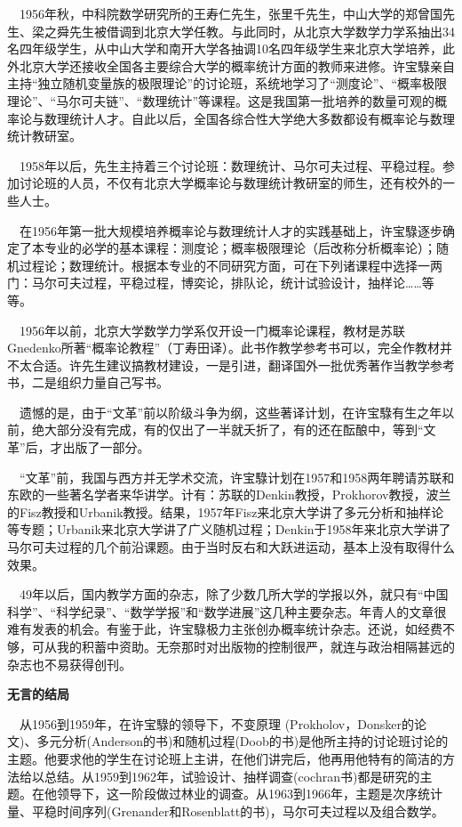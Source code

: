 \documentclass[a4paper,AutoFakeBold,oneside,12pt]{article}
\begin{document}
	$\quad$1956年秋，中科院数学研究所的王寿仁先生，张里千先生，中山大学的郑曾国先生、梁之舜先生被借调到北京大学任教。与此同时，从北京大学数学力学系抽出34名四年级学生，从中山大学和南开大学各抽调10名四年级学生来北京大学培养，此外北京大学还接收全国各主要综合大学的概率统计方面的教师来进修。许宝騄亲自主持“独立随机变量族的极限理论”的讨论班，系统地学习了“测度论”、“概率极限理论”、“马尔可夫链”、“数理统计”等课程。这是我国第一批培养的数量可观的概率论与数理统计人才。自此以后，全国各综合性大学绝大多数都设有概率论与数理统计教研室。

$\quad$1958年以后，先生主持着三个讨论班：数理统计、马尔可夫过程、平稳过程。参加讨论班的人员，不仅有北京大学概率论与数理统计教研室的师生，还有校外的一些人士。

	$\quad$在1956年第一批大规模培养概率论与数理统计人才的实践基础上，许宝騄逐步确定了本专业的必学的基本课程：测度论；概率极限理论（后改称分析概率论）；随机过程论；数理统计。根据本专业的不同研究方面，可在下列诸课程中选择一两门：马尔可夫过程，平稳过程，博奕论，排队论，统计试验设计，抽样论……等等。

$\quad$1956年以前，北京大学数学力学系仅开设一门概率论课程，教材是苏联Gnedenko所著“概率论教程”（丁寿田译）。此书作教学参考书可以，完全作教材并不太合适。许先生建议搞教材建设，一是引进，翻译国外一批优秀著作当教学参考书，二是组织力量自己写书。

$\quad$遗憾的是，由于“文革”前以阶级斗争为纲，这些著译计划，在许宝騄有生之年以前，绝大部分没有完成，有的仅出了一半就夭折了，有的还在酝酿中，等到“文革”后，才出版了一部分。

	$\quad$“文革”前，我国与西方并无学术交流，许宝騄计划在1957和1958两年聘请苏联和东欧的一些著名学者来华讲学。计有：苏联的Denkin教授，Prokhorov教授，波兰的Fisz教授和Urbanik教授。结果，1957年Fisz来北京大学讲了多元分析和抽样论等专题；Urbanik来北京大学讲了广义随机过程；Denkin于1958年来北京大学讲了马尔可夫过程的几个前沿课题。由于当时反右和大跃进运动，基本上没有取得什么效果。

$\quad$49年以后，国内教学方面的杂志，除了少数几所大学的学报以外，就只有“中国科学”、“科学纪录”、“数学学报”和“数学进展”这几种主要杂志。年青人的文章很难有发表的机会。有鉴于此，许宝騄极力主张创办概率统计杂志。还说，如经费不够，可从我的积蓄中资助。无奈那时对出版物的控制很严，就连与政治相隔甚远的杂志也不易获得创刊。

	\textbf{无言的结局}

$\quad$从1956到1959年，在许宝騄的领导下，不变原理 (Prokholov，Donsker的论文)、多元分析(Anderson的书)和随机过程(Doob的书)是他所主持的讨论班讨论的主题。他要求他的学生在讨论班上主讲，在他们讲完后，他再用他特有的简洁的方法给以总结。从1959到1962年，试验设计、抽样调查(cochran书)都是研究的主题。在他领导下，这一阶段做过林业的调查。从1963到1966年，主题是次序统计量、平稳时间序列(Grenander和Rosenblatt的书)，马尔可夫过程以及组合数学。
\end{document}
